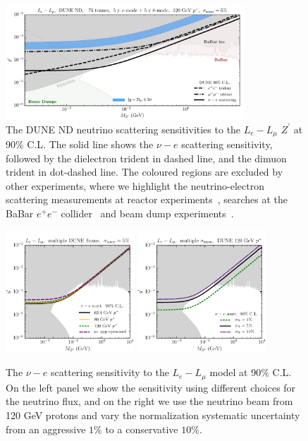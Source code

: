 %
\begin{figure}[t]
\centering
\includegraphics[width=0.8\textwidth]{lelmu.pdf}
 \caption{The DUNE ND neutrino scattering sensitivities to the $L_e - L_\mu$ $Z^\prime$ at 90\% C.L. The solid line shows the $\nu-e$ scattering sensitivity, followed by the dielectron trident in dashed line, and the dimuon trident in dot-dashed line. The coloured regions are excluded by other experiments, where we highlight the neutrino-electron scattering measurements at reactor experiments~\cite{Wong:2006nx,Deniz:2009mu,Chen:2014dsa}, searches at the BaBar $e^+e^-$ collider~\cite{Lees:2014xha, Lees:2017lec} and beam dump experiments~\cite{Bauer:2018onh}.\label{fig:Le_Lmu}}
\end{figure}
%
\begin{figure}[t]
\centering
    \includegraphics[width=0.43\textwidth]{lelmu_fluxes.pdf}
    \includegraphics[width=0.43\textwidth]{lelmu_sys.pdf}
 \caption{The $\nu-e$ scattering sensitivity to the $L_e - L_\mu$ model at 90\% C.L. On the left panel we show the sensitivity using different choices for the neutrino flux, and on the right we use the neutrino beam from 120 GeV protons and vary the normalization systematic uncertainty from an aggressive $1\%$ to a conservative $10\%$. \label{fig:Le_Lmu_varied}}
\end{figure}
%
